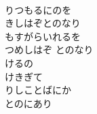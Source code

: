 \documentclass[10pt,b5j]{tarticle} %
\begin{document}
\begin{enumerate}
\begin{minipage}[c]{\blocksize}
    \end{minipage}
    \begin{minipage}[c]{\blocksize}
        
        \vspace{\linespace}
        \item~\\
        りつもるにのを\\
        きしはぞとのなり\\
        もすがらいれるを\\
        つめしはぞ
        とのなり\\
        けるの\\
        けきぎて\\
        りしことばにか\\
        とのにあり
    
    \end{minipage}
\end{enumerate} %
\end{document}

